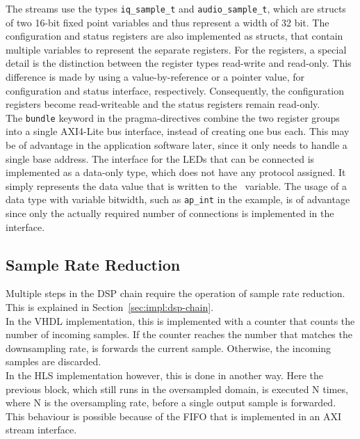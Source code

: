 The streams use the types \texttt{iq\_sample\_t} and \texttt{audio\_sample\_t}, which are structs of two 16-bit fixed point variables and thus represent a width of 32 bit.
The configuration and status registers are also implemented as structs, that contain multiple variables to represent the separate registers.
For the registers, a special detail is the distinction between the register types read-write and read-only.
This difference is made by using a value-by-reference or a pointer value, for configuration and status interface, respectively.
Consequently, the configuration registers become read-writeable and the status registers remain read-only.\\

The \texttt{bundle} keyword in the pragma-directives combine the two register groups into a single AXI4-Lite bus interface, instead of creating one bus each.
This may be of advantage in the application software later, since it only needs to handle a single base address.
The interface for the LEDs that can be connected is implemented as a data-only type, which does not have any protocol assigned.
It simply represents the data value that is written to the \cplusplus\ variable.
The usage of a data type with variable bitwidth, such as \texttt{ap\_int} in the example, is of advantage since only the actually required number of connections is implemented in the interface.

\subsection{Sample Rate Reduction}
\label{sec:impl:hls:sample_rate_reduction}

Multiple steps in the DSP chain require the operation of sample rate reduction.
This is explained in Section~\ref{sec:impl:dsp-chain}.\\

In the VHDL implementation, this is implemented with a counter that counts the number of incoming samples.
If the counter reaches the number that matches the downsampling rate, is forwards the current sample.
Otherwise, the incoming samples are discarded.\\

In the HLS implementation however, this is done in another way.
Here the previous block, which still runs in the oversampled domain, is executed N times, where N is the oversampling rate, before a single output sample is forwarded.
This behaviour is possible because of the FIFO that is implemented in an AXI stream interface.\\

